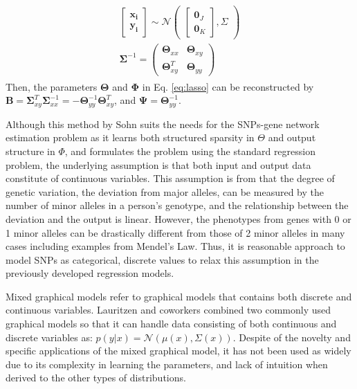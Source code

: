 \documentclass{article}
\begin{document}
\begin{align}\label{eq:jointG}
\begin{split}
\begin{bmatrix}
    \mathbf{x_i}\\
    \mathbf{y_i}
\end{bmatrix}
 \sim \mathcal{N}
 \begin{pmatrix}
\begin{bmatrix}
    \mathbf{0}_J  \\
   \mathbf{0}_K
\end{bmatrix}
,
    \Sigma
\end{pmatrix} \\
\mathbf{\Sigma}^{-1}= \begin{pmatrix}
    \mathbf{\Theta}_{xx} & \mathbf{\Theta}_{xy}\\
   \mathbf{\Theta}_{xy}^T &  \mathbf{\Theta}_{yy}  
\end{pmatrix}
\end{split}
\end{align}
Then, the parameters $\mathbf{\Theta}$ and $\mathbf{\Phi}$ in Eq. \ref{eq:lasso} can be reconstructed by $\mathbf{B}=\mathbf{\Sigma}_{xy}^T \mathbf{\Sigma}_{xx}^{-1}=-\mathbf{\Theta}_{yy}^{-1}\mathbf{\Theta}_{xy}^T$, and $\mathbf{\Psi}= \mathbf{\Theta}_{yy}^{-1}$.


Although this method by Sohn suits the needs for the SNPs-gene network estimation problem as it learns both structured sparsity in $\Theta$ and output structure in $\Phi$, and formulates the problem using the standard regression problem, the underlying assumption is that both input and output data constitute of continuous variables. This assumption is from that the degree of genetic variation, the deviation from major alleles, can be measured by the number of minor alleles in a person's genotype, and the relationship between the deviation and the output is linear. However, the phenotypes from genes with 0 or 1 minor alleles can be drastically different from those of 2 minor alleles in many cases including examples from Mendel's Law.  Thus, it is reasonable approach to model SNPs as categorical, discrete values to relax this assumption in the previously developed regression models. 


Mixed graphical models refer to graphical models that contains both discrete and continuous variables. Lauritzen and coworkers \cite{lauritzen1989graphical} combined two commonly used graphical models so that it can handle data consisting of both continuous and discrete variables as: $p(y|x) = \mathcal{N}(\mu(x), \Sigma(x))$. Despite of the novelty and specific applications of the mixed graphical model, it has not been used as widely due to its complexity in learning the parameters, and lack of intuition when derived to the other types of distributions.
\end{document}
